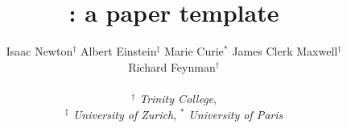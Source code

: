 \title{\sys: a paper template}

\ifdefined\DRAFT
 \pagestyle{fancyplain}
 \rhead{\thedate}
\fi


\author{
 Isaac Newton$^\dagger$\; 
 Albert Einstein$^\ddagger$\;
 Marie Curie$^\ast$\;
 James Clerk Maxwell$^\dagger$\;
\\
 Richard Feynman$^\dagger$\;
\\\\
 \emph{$^\dagger$  Trinity College}, \\
 \emph{$^\ddagger$ University of Zurich}, 
 \emph{$^\ast$ 	 University of Paris}
}


